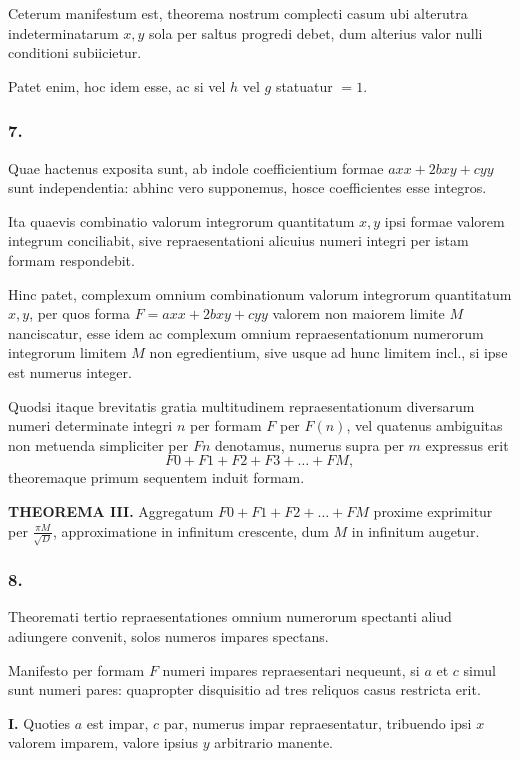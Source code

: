 \documentclass[12pt,a4paper]{article}
\begin{document}
Ceterum manifestum est, theorema nostrum complecti casum ubi alterutra indeterminatarum $x, y$ sola per saltus progredi debet, dum alterius valor nulli conditioni subiicietur.

Patet enim, hoc idem esse, ac si vel $h$ vel $g$ statuatur $=1$.

\subsubsection*{7.}

Quae hactenus exposita sunt, ab indole coefficientium formae $axx+2bxy+cyy$ sunt independentia: abhinc vero supponemus, hosce coefficientes esse integros.

Ita quaevis combinatio valorum integrorum quantitatum $x, y$ ipsi formae valorem integrum conciliabit, sive repraesentationi alicuius numeri integri per istam formam respondebit.

Hinc patet, complexum omnium combinationum valorum integrorum quantitatum $x, y$, per quos forma $F=axx+2bxy+cyy$ valorem non maiorem limite $M$ nanciscatur, esse idem ac complexum omnium repraesentationum numerorum integrorum limitem $M$ non egredientium, sive usque ad hunc limitem incl., si ipse est numerus integer.

Quodsi itaque brevitatis gratia multitudinem repraesentationum diversarum numeri determinate integri $n$ per formam $F$ per $F(n)$, vel quatenus ambiguitas non metuenda simpliciter per $Fn$ denotamus, numerus supra per $m$ expressus erit
\[
F0+F1+F2+F3+\ldots+FM,
\]
theoremaque primum sequentem induit formam.

\textbf{THEOREMA III.} Aggregatum $F0+F1+F2+\ldots+FM$ proxime exprimitur per $\frac{\pi M}{\sqrt{D}}$, approximatione in infinitum crescente, dum $M$ in infinitum augetur.

\subsubsection*{8.}

Theoremati tertio repraesentationes omnium numerorum spectanti aliud adiungere convenit, solos numeros impares spectans.

Manifesto per formam $F$ numeri impares repraesentari nequeunt, si $a$ et $c$ simul sunt numeri pares: quapropter disquisitio ad tres reliquos casus restricta erit.

\textbf{I.} Quoties $a$ est impar, $c$ par, numerus impar repraesentatur, tribuendo ipsi $x$ valorem imparem, valore ipsius $y$ arbitrario manente.
\end{document}
